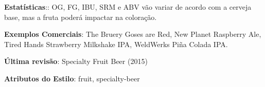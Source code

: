 \textbf{Estatísticas}:: OG, FG, IBU, SRM e ABV vão variar de acordo com a cerveja base, mas a fruta poderá impactar na coloração.

\textbf{Exemplos Comerciais}: The Bruery Goses are Red, New Planet Raspberry Ale, Tired Hands Strawberry Milkshake IPA, WeldWerks Piña Colada IPA.

\textbf{Última revisão}: Specialty Fruit Beer (2015)

\textbf{Atributos do Estilo}: fruit, specialty-beer
